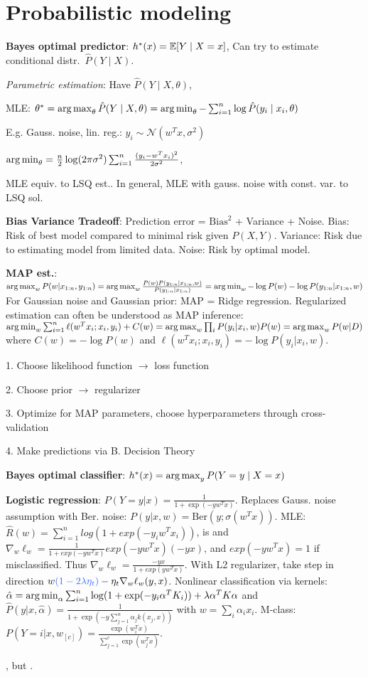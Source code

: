\section{Probabilistic modeling}

\textbf{Bayes optimal predictor}: $h^*(x) = \mathbb{E}[Y \mid X = x]$, 
Can try to estimate conditional distr.\ $\hat{P}(Y\mid X)$.

\emph{Parametric estimation}: Have $\hat{P}(Y \mid X, \theta)$, 

MLE: $\theta^* = \operatorname*{arg\,max}_\theta \hat{P}(Y \mid X, \theta) = \operatorname*{arg\,min}_\theta -\sum_{i=1}^n \log\hat{P}(y_i \mid x_i, \theta)$

E.g. Gauss. noise, lin. reg.: $y_i \sim \mathcal{N}(w^T x, \sigma^2)$

$\operatorname*{arg\,min}_\theta = \frac{n}{2} \log(2 \pi \sigma^2) \sum_{i=1}^n \frac{(y_i - w^T x_i)^2}{2 \sigma^2}$,

MLE equiv. to LSQ est.. In general, MLE with gauss. noise with const. var.  to LSQ sol.

\textbf{Bias Variance Tradeoff}: Prediction error = $\text{Bias}^2$ + Variance + Noise. Bias: Risk of best model compared to minimal risk given $P(X,Y)$. Variance: Risk due to estimating model from limited data. Noise: Risk by optimal model. 

\textbf{MAP est.}: $\operatorname*{arg\,max}_w P(w | x_{1:n}, y_{1:n}) = \operatorname*{arg\,max}_w \frac{P(w) P(y_{1:n} | x_{1:n}, w )}{P(y_{1:n} | x_{1:n})} = \operatorname*{arg\,min}_w - \log P(w) - \log P(y_{1:n} | x_{1:n}, w )$ For Gaussian noise and Gaussian prior: MAP = Ridge regression. Regularized estimation can often be understood as MAP inference:  $\operatorname*{arg\,min}_w \sum_{i=1}^n \ell(w^T x_i; x_i, y_i) + C(w) = \operatorname*{arg\,max}_w \prod_i P(y_i | x_i, w) P(w) = \operatorname*{arg\,max}_w P(w|D)$ where $C(w) = - \log P(w)$ and $\ell(w^T x_i; x_i, y_i) = - \log P(y_i | x_i, w)$.

1. Choose likelihood function $\rightarrow$ loss function

2. Choose prior $\rightarrow$ regularizer

3. Optimize for MAP parameters, choose hyperparameters through cross-validation

4. Make predictions via B. Decision Theory

\textbf{Bayes optimal classifier}: $h^*(x) = \operatorname*{arg\,max}_y P(Y = y \mid X = x)$

\textbf{Logistic regression}: $P(Y=y|x) = \frac{1}{1+\exp(-y w^T x)}$. Replaces Gauss. noise assumption with Ber. noise: $P(y|x,w)=\text{Ber}(y;\sigma(w^T x)).$
MLE: $\hat{R}(w) = \sum_{i=1}^n log(1 + exp(-y_iw^Tx_i))$, is 
and $\nabla_w \ell_w = \frac{1}{1+exp(-yw^Tx)} exp(-yw^Tx) (-yx)$, and
$exp(-yw^Tx) = 1$ if misclassified. Thus $\nabla_w \ell_w =
\frac{-yx}{1+exp(yw^Tx)}$. With L2 regularizer, take step in direction
$w\blue{(1-2\lambda\eta_t)} - \eta_t \nabla_w \ell_w(y, x)$. Nonlinear classification via
kernels: $\hat{\alpha} = \operatorname*{arg\,min}_{\alpha} \sum_{i=1}^n \log (1+\exp(-y_i \alpha^T K_i)) + \lambda \alpha^T K \alpha$ and $\hat{P}(y | x, \hat{\alpha}) = \frac{1}{1+\exp(-y \sum_{j=1}^n \alpha_j k(x_j, x))}$ with $w = \sum_i \alpha_i x_i$. M-class: $P(Y = i | x,w_{[c]}) = \frac{\exp(w_i^T x)}{\sum_{j=1}^c \exp(w_j^T x)}$.

, but .
